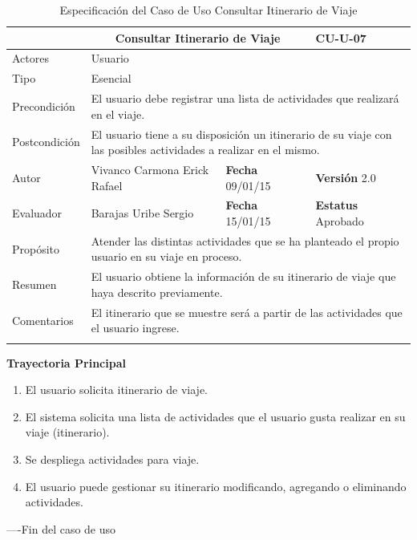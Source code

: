 \begin{longtable}{|p{2.5cm}|p{6.4cm}|p{2cm}|p{2cm}|}
	\hline
		\rowcolor[RGB]{51,153,255}{Caso de Uso}&\multicolumn{2}{c}{Consultar Itinerario de Viaje}&{\textbf{CU-U-07}}\\
	\hline
		{Actores}&\multicolumn{3}{p{11.2cm}|}{Usuario}\\
	\hline
		{Tipo}&\multicolumn{3}{p{11.2cm}|}{Esencial}\\
	\hline
		{Precondición}&\multicolumn{3}{p{11.2cm}|}{El usuario debe registrar una lista de actividades que realizará en el viaje.}\\
	\hline
		{Postcondición}&\multicolumn{3}{p{11.2cm}|}{El usuario tiene a su disposición un itinerario de su viaje con las posibles 
		actividades a realizar en el mismo.}\\
	\hline
		{Autor}&{Vivanco Carmona Erick Rafael}&{\textbf{Fecha} 09/01/15}&{\textbf{Versión} 2.0}\\
			\hline
		{Evaluador}&{Barajas Uribe Sergio}&{\textbf{Fecha} 15/01/15}&{\textbf{Estatus} Aprobado}\\
	\hline
		{Propósito}&\multicolumn{3}{p{11.2cm}|}{Atender las distintas actividades que se ha planteado el propio usuario en su viaje en proceso.}\\
	\hline
		{Resumen}&\multicolumn{3}{p{11.2cm}|}{El usuario obtiene la información de su itinerario de viaje que haya descrito previamente.}\\	
	\hline
		{Comentarios}&\multicolumn{3}{p{11.2cm}|}{El itinerario que se muestre será a partir de las actividades que el usuario ingrese.}\\	
	\hline
	\caption[Especificación del Caso de Uso Consultar Itinerario de Viaje]{Especificación del Caso de Uso Consultar Itinerario de Viaje}
    	\label{tab:cuConsultarItinerarioViaje}
\end{longtable}
\newpage
\begin{flushleft}
	\textbf{Trayectoria Principal}\\
	\begin{enumerate}
		\item El usuario solicita itinerario de viaje.
		\item El sistema solicita una lista de actividades que el usuario gusta realizar en su viaje (itinerario).
		\item Se despliega actividades para viaje.
		\item El usuario puede gestionar su itinerario modificando, agregando o eliminando actividades.
	\end{enumerate}
\end{flushleft}
----Fin del caso de uso

